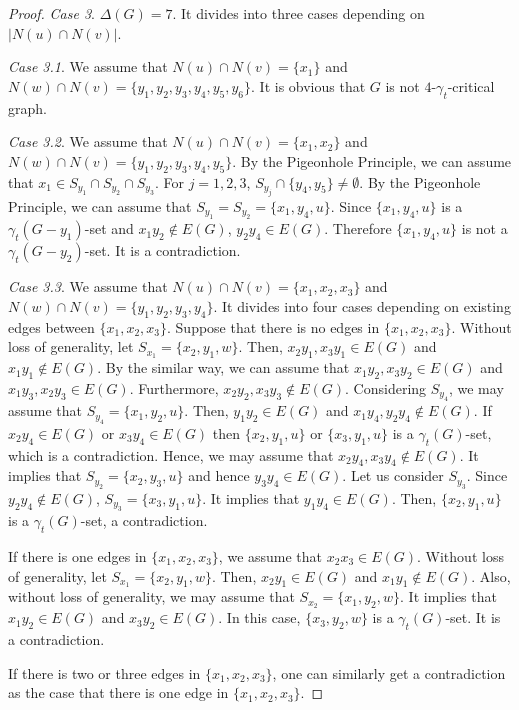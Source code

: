 \documentclass[12pt]{amsart}
\begin{document}
\begin{proof}
\noindent\emph{Case 3}. $\Delta(G)=7$.  It divides into three cases depending on $|N(u)\cap N(v)|$.

\noindent\emph{Case 3.1}. We assume that $N(u)\cap N(v) = \{x_1\}$ and $N(w)\cap N(v) = \{y_1, y_2, y_3,y_4, y_5, y_6\}$.
It is obvious that $G$ is not $4$-$\gamma_{t}$-critical graph.

\noindent\emph{Case 3.2}. We assume that $N(u)\cap N(v) = \{x_1, x_2\}$ and $N(w)\cap N(v) = \{y_1, y_2, y_3, y_4, y_5\}$.
By the Pigeonhole Principle, we can assume that $x_{1}\in S_{y_{1}}\cap S_{y_{2}}\cap S_{y_{3}}$. For $j = 1,2,3$, $S_{y_{j}} \cap \{y_4, y_5\} \neq \emptyset$. By the Pigeonhole Principle, we can assume that  $S_{y_{1}} = S_{y_{2}} = \{ x_1, y_4, u\}$. Since $\{x_1, y_4, u\}$ is a $\gamma_{t}(G-y_1)$-set and $x_1y_2 \notin E(G)$, $y_2y_4 \in E(G).$ Therefore $\{ x_1, y_4, u\}$ is not a $\gamma_{t}(G-y_2)$-set. It is a contradiction.

\noindent\emph{Case 3.3}. We assume that $N(u)\cap N(v) = \{x_1, x_2, x_3\}$ and $N(w)\cap N(v) = \{y_1, y_2, y_3,y_4 \}$. It divides into four cases depending on existing edges between $\{x_1, x_2, x_3\}$. Suppose that there is no edges in  $\{x_1, x_2, x_3\}$.
Without loss of generality, let $S_{x_{1}} =\{ x_2, y_1, w\}$. Then,  $x_2y_1, x_3y_1 \in E(G)$ and $x_1y_1 \notin E(G)$. By the similar way, we can assume that $x_1y_2, x_3y_2 \in E(G)$ and  $x_1y_3, x_2y_3 \in E(G)$. Furthermore,  $x_2y_2, x_3y_3 \notin E(G)$.
Considering  $S_{y_{4}}$, we may assume that $S_{y_4} = \{x_1, y_2, u \}$. Then, $y_1y_2 \in E(G)$ and $x_1y_4, y_2y_4 \notin E(G)$. If $x_2y_4 \in E(G)$ or $x_3y_4 \in E(G)$ then $\{x_2, y_1, u\}$ or $\{x_3, y_1, u\}$ is a $\gamma_{t}(G)$-set, which is a contradiction. Hence, we may assume that
 $x_2y_4, x_3y_4 \notin E(G)$.  It implies that $S_{y_2}=\{x_2, y_3, u \}$ and hence $y_3y_4 \in E(G)$.  Let us consider $S_{y_3}$. Since $y_2y_4 \notin E(G)$, $S_{y_3} = \{ x_3, y_1, u \}$. It implies that $y_1y_4 \in E(G)$. Then, $\{x_2, y_1, u\}$ is a $\gamma_{t}(G)$-set,  a contradiction.

If there is one edges in  $\{x_1, x_2, x_3\}$,  we assume that $x_2x_3 \in E(G)$.  Without loss of generality, let $S_{x_{1}} = \{x_2, y_1, w \}$. Then,   $x_2y_1 \in E(G)$ and $x_1y_1 \notin E(G)$.  Also, without loss of generality, we may assume that  $S_{x_{2}} = \{x_1, y_2, w \}$. It implies that $x_1y_2 \in E(G)$ and $x_3y_2 \in E(G)$. In this case, $\{x_3, y_2, w\}$ is a $\gamma_{t}(G)$-set.  It is a contradiction.

If there is two or three edges in  $\{x_1, x_2, x_3\}$, one can similarly get a contradiction as the case that there is one edge in  $\{x_1, x_2, x_3\}$.
\end{proof}
\end{document}
